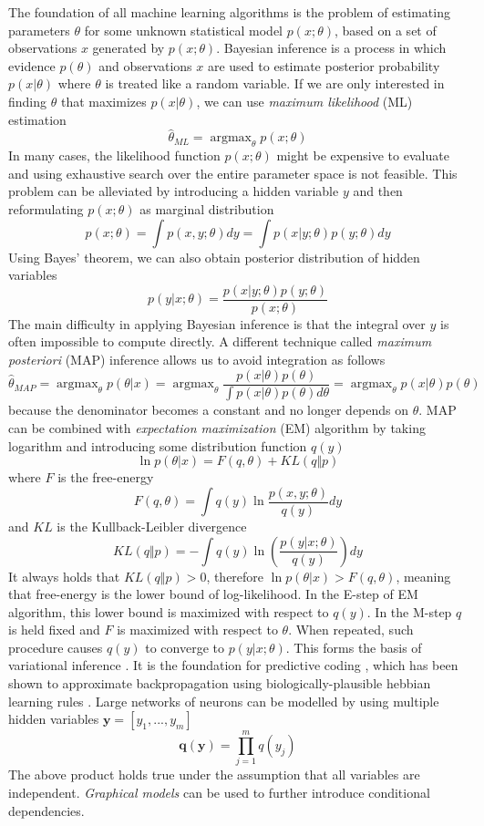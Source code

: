 \documentclass[oneside,english,logo]{amuthesis}
\DeclareMathOperator*{\argmax}{argmax}
\begin{document}
The foundation of all machine learning algorithms is the problem of estimating parameters $\theta$ for some unknown statistical model $p(x;\theta)$, based on a set of observations $x$ generated by $p(x;\theta)$.  Bayesian inference \cite{var_inf} is a process in which evidence $p(\theta)$ and observations $x$ are used to estimate posterior probability $p(x|\theta)$ where $\theta$ is treated like a random variable.
If we are only interested in finding $\theta$ that maximizes $p(x|\theta)$,  we can use \textit{maximum likelihood} (ML) estimation
\[
\hat{\theta}_{ML} = \argmax_\theta p(x;\theta)
\]
In many cases, the likelihood function $p(x;\theta)$ might be expensive to evaluate and using exhaustive search over the entire parameter space is not feasible. This problem can be alleviated by introducing a hidden variable $y$ and then reformulating $p(x;\theta)$ as marginal distribution 
\[
p(x;\theta) = \int p(x, y;\theta) dy = \int p(x|y;\theta) p(y;\theta)  dy
\]
Using Bayes' theorem, we can also obtain posterior distribution of hidden variables
\[
p(y|x;\theta) = \frac{p(x|y;\theta)p(y;\theta)}{p(x;\theta)}
\]
The main difficulty in applying Bayesian inference is that the integral over $y$ is often impossible to compute directly. A different technique called \textit{maximum posteriori} (MAP) inference allows us to avoid integration as follows
\[
\hat{\theta}_{MAP} = \argmax_\theta p(\theta|x) = \argmax_\theta \frac{p(x|\theta)p(\theta)}{\int p(x|\theta)p(\theta) d\theta} = \argmax_\theta p(x|\theta)p(\theta)
\]
because the denominator becomes a constant and no longer depends on $\theta$.
MAP can be combined with \textit{expectation maximization} (EM) \cite{em_alg} algorithm by taking logarithm and introducing some distribution function $q(y)$
\[
\ln p(\theta | x) = F(q,\theta) + KL(q\Vert p) 
\]
where $F$ is the free-energy
\[
F(q,\theta) = \int q(y) \ln \frac{p(x,y;\theta)}{q(y)} dy
\]
and $KL$ is the Kullback-Leibler divergence
\[
KL(q\Vert p) = -\int  q(y)\ln(\frac{p(y|x;\theta)}{q(y)}) dy
\]
It always holds that $KL(q\Vert p) > 0$, therefore $\ln p(\theta | x) > F(q,\theta)$,  meaning that free-energy is the lower bound of  log-likelihood. 
In the E-step of EM algorithm, this lower  bound is maximized with respect to $q(y)$. In the M-step $q$ is held fixed and $F$ is maximized with respect to $\theta$.
When repeated, such procedure causes $q(y)$ to converge to $p(y|x;\theta)$. 
This forms the basis of variational inference \cite{var_inf}. It is the foundation for predictive coding \cite{pred_coding, free_energy_principle_and_brain}, which has been shown to approximate backpropagation using biologically-plausible hebbian learning rules \cite{pred_coding_comp_graph}. Large networks of neurons can be modelled by using multiple hidden variables  $\boldsymbol{y}=[y_1,...,y_m]$
\[
\boldsymbol{q}(\boldsymbol{y}) = \prod_{j=1}^{m} q(y_j)
\]
The above product holds true under the assumption that all variables are independent. \textit{Graphical models} can be used to further introduce conditional dependencies. 
\end{document}
